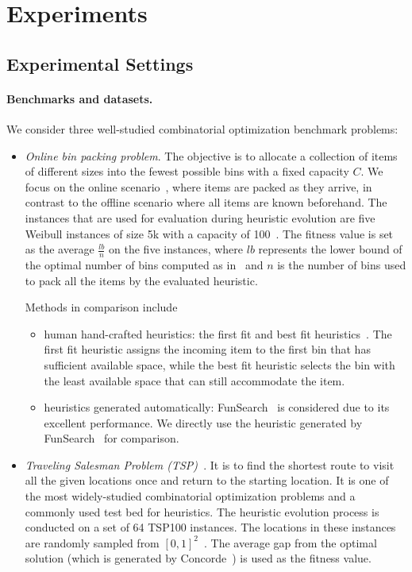 
\section{Experiments}\label{sec:experiment}

\subsection{Experimental Settings}
\paragraph{Benchmarks and datasets.} We consider three well-studied combinatorial optimization benchmark problems: 
\begin{itemize}
    \item \textit{Online bin packing problem}. The objective is to allocate a collection of items of different sizes into the fewest possible bins with a fixed capacity $C$. We focus on the online scenario~\cite{seiden2002online}, where items are packed as they arrive, in contrast to the offline scenario where all items are known beforehand. The instances that are used for evaluation during heuristic evolution are five Weibull instances of size 5k with a capacity of 100~\cite{romera2024mathematical}. The fitness value is set as the average $\frac{lb}{n}$ on the five instances, where $lb$ represents the lower bound of the optimal number of bins computed as in~\citet{martello1990lower} and $n$ is the number of bins used to pack all the items by the evaluated heuristic. 

    Methods in comparison include 
    \begin{itemize}
        \item human hand-crafted heuristics: the first fit and best fit heuristics~\cite{romera2024mathematical}. The first fit heuristic assigns the incoming item to the first bin that has sufficient available space, while the best fit heuristic selects the bin with the least available space that can still accommodate the item. 
        \item heuristics generated automatically: FunSearch~\cite{romera2024mathematical} is considered due to its excellent performance. We directly use the heuristic generated by FunSearch~\cite{romera2024mathematical} for comparison.
    \end{itemize}
    \item \textit{Traveling Salesman Problem (TSP)~\cite{matai2010traveling}}. It is to find the shortest route to visit all the given locations once and return to the starting location. It is one of the most widely-studied combinatorial optimization problems and a commonly used test bed for heuristics. The heuristic evolution process is conducted on a set of 64 TSP100 instances. The locations in these instances are randomly sampled from $[0,1]^2$~\cite{kool2018attention}. The average gap from the optimal solution (which is generated by Concorde~\cite{applegate2006concorde}) is used as the fitness value.  
    

\end{itemize}
